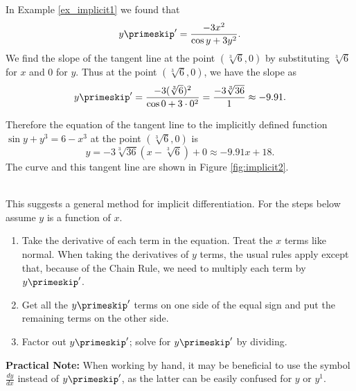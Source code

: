 {In Example \ref{ex_implicit1} we found that $$y\primeskip' = \frac{-3x^2}{\cos y +3y^2}.$$ We find the slope of the tangent line at the point  $(\sqrt[3]6,0)$ by substituting $\sqrt[3]6$ for $x$ and $0$ for $y$. Thus at the point $(\sqrt[3]6,0)$, we have the slope as $$y\primeskip' = \frac{-3(\sqrt[3]{6})^2}{\cos 0 + 3\cdot0^2} = \frac{-3\sqrt[3]{36}}{1} \approx -9.91.$$

Therefore the equation of the tangent line to the implicitly defined function $\sin y + y^3=6-x^3$ at the point $(\sqrt[3]{6},0)$ is $$y = -3\sqrt[3]{36}(x-\sqrt[3]{6})+0 \approx -9.91x+18.$$ The curve and this tangent line are shown in Figure \ref{fig:implicit2}.
}\\


This suggests a general method for implicit differentiation.  For the steps below assume $y$ is a function of $x$.
\begin{enumerate}
\item Take the derivative of each term in the equation.  Treat the $x$ terms like normal.  When taking the derivatives of $y$ terms, the usual rules apply except that, because of the Chain Rule, we need to multiply each term by $y\primeskip'$.
\item Get all the $y\primeskip'$ terms on one side of the equal sign and put the remaining terms on the other side.
\item Factor out $y\primeskip'$;  solve for $y\primeskip'$ by dividing.
\end{enumerate}

\noindent\textbf{Practical Note:} When working by hand, it may be beneficial to use the symbol $\frac{dy}{dx}$ instead of $y\primeskip'$, as the latter can be easily confused for $y$ or $y^1$.\\

